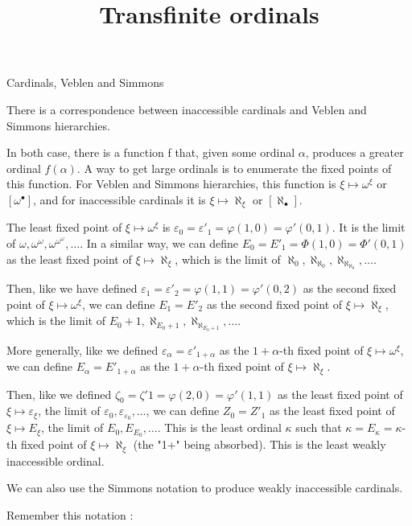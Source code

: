 \documentclass[10pt]{article}
\title{Transfinite ordinals}
\begin{document}
Cardinals, Veblen and Simmons

There is a correspondence between inaccessible cardinals and Veblen and Simmons hierarchies.

In both case, there is a function f that, given some ordinal \( \alpha \), produces a greater ordinal \( f(\alpha) \). A way to get large ordinals is to enumerate the fixed points of this function. For Veblen and Simmons hierarchies, this function is \( \xi \mapsto \omega^\xi \) or \( [\omega^\bullet] \), and for inaccessible cardinals it is \( \xi \mapsto \aleph_\xi \) or \( [\aleph_\bullet] \). 

The least fixed point of \( \xi \mapsto \omega^\xi \) is \( \varepsilon_0 =  \varepsilon'_1 = \varphi(1,0) = \varphi'(0,1) \). It is the limit of \( \omega, \omega^\omega, \omega^{\omega^\omega}, \ldots \). In a similar way, we can define \( E_0 = E'_1 = \Phi(1,0) = \Phi'(0,1) \) as the least fixed point of \( \xi \mapsto \aleph_\xi \), which is the limit of \( \aleph_0, \aleph_{\aleph_0}, \aleph_{\aleph_{\aleph_0}}, \ldots \).

Then, like we have defined \( \varepsilon_1 = \varepsilon'_2 = \varphi(1,1) = \varphi'(0,2) \) as the second fixed point of \( \xi \mapsto \omega^\xi \), we can define \( E_1 = E'_2 \) as the second fixed point of \( \xi \mapsto \aleph_\xi \), which is the limit of \( E_0+1, \aleph_{E_0+1}, \aleph_{\aleph_{E_0+1}}, \ldots \).

More generally, like we defined \( \varepsilon_\alpha = \varepsilon'_{1+\alpha} \) as the \(1+\alpha\)-th fixed point of \( \xi \mapsto \omega^\xi \), we can define \( E_\alpha = E'_{1+\alpha} \) as the \(1+\alpha\)-th fixed point of \( \xi \mapsto \aleph_\xi \).

Then, like we defined \( \zeta_0 = \zeta'1 = \varphi(2,0) = \varphi'(1,1) \) as the least fixed point of \( \xi \mapsto \varepsilon_\xi \), the limit of \( \varepsilon_0, \varepsilon_{\varepsilon_0}, \ldots \), we can define \( Z_0 = Z'_1 \) as the least fixed point of \( \xi \mapsto E_\xi \), the limit of \( E_0, E_{E_0}, \ldots \).
This is the least ordinal \( \kappa \) such that \( \kappa = E_\kappa = \kappa\)-th fixed point of \( \xi \mapsto \aleph_\xi \) (the "1+" being absorbed). This is the least weakly inaccessible ordinal.

\bigskip

We can also use the Simmons notation to produce weakly inaccessible cardinals.

Remember this notation : 
\end{document}
